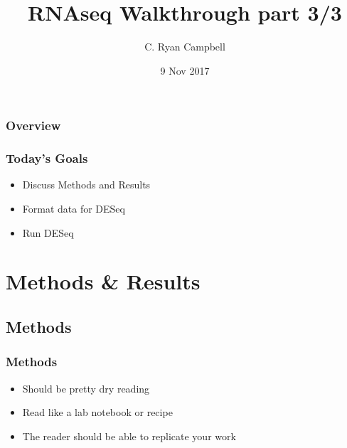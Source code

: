 \documentclass[14pt,handout]{beamer}
\title[RNAseq Practical pt3/3]{RNAseq Walkthrough part 3/3} %
\author{C. Ryan Campbell} %
\institute[Duke] %
{
Duke University \\ %
\medskip
\textit{c.ryan.campbell@duke.edu} %
}
\date{9 Nov 2017} %
\begin{document}
\begin{frame}
\titlepage %
\end{frame}

\begin{frame}
\frametitle{Overview} %
\tableofcontents %
\end{frame}


\begin{frame}
\frametitle{Today's Goals}
\begin{itemize}
	\item<+-> Discuss Methods and Results
	\item<+-> Format data for DESeq
	\item<+-> Run DESeq
\end{itemize}
\end{frame}


\section{Methods \& Results}

\subsection{Methods}

\begin{frame}
\frametitle{Methods}
\begin{itemize}
	\sffamily
	\normalsize
	\item<+-> Should be pretty dry reading
	\item<+-> Read like a lab notebook or recipe
	\item<+-> The reader should be able to replicate your work
\end{itemize}
\end{frame}
\end{document}
